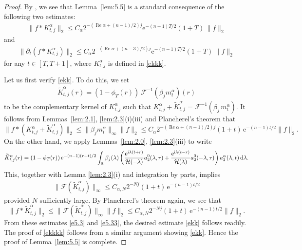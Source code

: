 \documentclass[11pt]{amsproc}
\newcommand{\R}{\mathbb{R}}
\newcommand{\e}{\mathrm{e}}
\newcommand{\0}{\mathbf{0}}
\newcommand{\bc}{{ \mathcal{H} }}
\newcommand{\F}{\mathscr{F}}
\renewcommand{\Re}{\mathop{\mathrm{Re}}}
\renewcommand{\i}{\mathrm{i}}
\renewcommand{\d}{\mathrm{d}}
\numberwithin{equation}{section}
\numberwithin{figure}{section}
\theoremstyle{definition}
\theoremstyle{remark}
\numberwithin{thm}{section}
\begin{document}
\begin{proof}  By \cite[Lemma 2.4.2]{So1}, we see that  
Lemma~\ref{lem:5.5} is  a standard consequence of the following 
two estimates: 
\begin{eqnarray}\label{ekk}
\|f*K^\alpha_{t,j}\|_2\leq C_{\alpha}2^{-(\Re \alpha+(n-1)/2)j}\e^{-(n-1)T/2}(1+T)\,\|f\|_2 
\end{eqnarray}
and
\begin{eqnarray}\label{ekkkk}
\|\partial_t(f*K^\alpha_{t,j})\|_2\leq C_{\alpha}2^{-(\Re \alpha+(n-3)/2)j}\e^{-(n-1)T/2}(1+T)\,\|f\|_2 
\end{eqnarray}
for any $t\in[T,T+1]$, %
where 
$K^\alpha_{t,j}$ is defined in  \eqref{ekkk}.

Let us first verify \eqref{ekk}.
To do this, we set
\begin{eqnarray*}
\widetilde{K}^\alpha_{t,j}(r)=(1-\phi_T(r))\,\F^{-1}(\beta_jm^\alpha_t)(r)
\end{eqnarray*}
to be the complementary kernel of $K^\alpha_{t,j}$ such that $K^\alpha_{t,j}+\widetilde{K}^\alpha_{t,j}=\F^{-1}(\beta_j\,m^\alpha_t)$.
It follows from Lemmas~\ref{lem:2.1}, \ref{lem:2.3}(i)(iii)  and Plancherel's theorem that
\begin{equation}\label{e5.3}
\|f*(K^\alpha_{t,j}+\widetilde{K}^\alpha_{t,j})\|_2 \leq \|\beta_jm^\alpha_t\|_\infty \|f\|_2  \leq  C_\alpha 2^{-(\Re\alpha+(n-1)/2)j}(1+t)\,\e^{-(n-1)t/2} \|f\|_2.
\end{equation}
On  
the other 
hand, we apply  Lemmas~\ref{lem:2.0}, \ref{lem:2.3}(iii) to write
$$
\widetilde{K}^\alpha_{t,j}(r)=(1-\phi_T(r))\,\e^{-(n-1)(r+t)/2}\int_\R\beta_j(\lambda)\left({\e^{\i\lambda(t+ r)}\over \bc(-\lambda)}a_2^0(\lambda,r)+{\e^{\i\lambda(t-r)}\over \bc(\lambda)}a_2^0(-\lambda,r)\right)a_2^\alpha(\lambda,t)\,\d \lambda.
$$
This, together with Lemma \ref{lem:2.3}(i) and  integration by parts,   implies
\begin{eqnarray*}
\|\F(\widetilde{K}^\alpha_{t,j})\|_\infty
\leq C_{\alpha,N}2^{-Nj}(1+t)\,\e^{-(n-1)t/2}
\end{eqnarray*}
provided $N$ sufficiently large. By   Plancherel's theorem again, we see that
\begin{equation}\label{e5.33}
\|f*\widetilde{K}^\alpha_{t,j}\|_2\leq\|\F(\widetilde{K}^\alpha_{t,j})\|_\infty\|f\|_2\leq  C_{\alpha,N}2^{-Nj}(1+t)\,\e^{-(n-1)t/2}    \|f\|_2.
\end{equation}
From these estimates \eqref{e5.3} and \eqref{e5.33},      the desired estimate  \eqref{ekk} follows readily. The proof of   \eqref{ekkkk} follows from a similar argument showing \eqref{ekk}. 
Hence the proof of Lemma~\ref{lem:5.5} is complete.
\end{proof}
\end{document}
